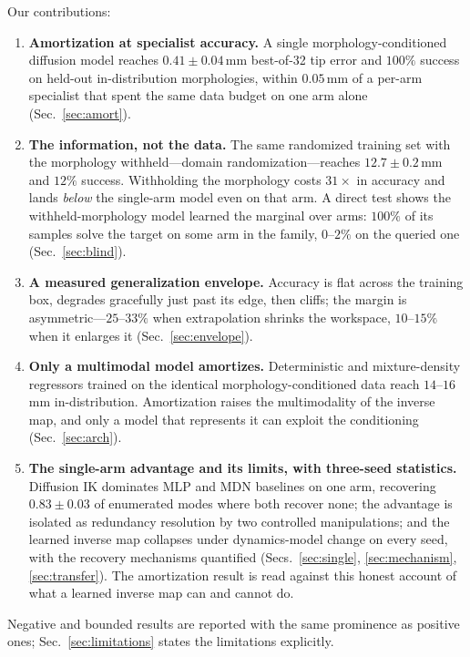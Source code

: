 \documentclass[robotics,article,submit,moreauthors]{Definitions/mdpi}
\begin{document}
Our contributions:
\begin{enumerate}
  \item \textbf{Amortization at specialist accuracy.} A single
  morphology-conditioned diffusion model reaches $0.41\pm0.04\,$mm
  best-of-32 tip error and $100\%$ success on held-out in-distribution
  morphologies, within $0.05\,$mm of a per-arm specialist that spent the
  same data budget on one arm alone (Sec.~\ref{sec:amort}).
  \item \textbf{The information, not the data.} The same randomized training
  set with the morphology withheld---domain randomization---reaches
  $12.7\pm0.2\,$mm and $12\%$ success. Withholding the morphology costs $31\times$
  in accuracy and lands \emph{below} the single-arm model even on that
  arm. A direct test shows the withheld-morphology model learned the
  marginal over arms: $100\%$ of its samples solve the target on some arm
  in the family, $0$--$2\%$ on the queried one (Sec.~\ref{sec:blind}).
  \item \textbf{A measured generalization envelope.} Accuracy is flat across
  the training box, degrades gracefully just past its edge, then cliffs;
  the margin is asymmetric---$25$--$33\%$ when extrapolation shrinks the
  workspace, $10$--$15\%$ when it enlarges it (Sec.~\ref{sec:envelope}).
  \item \textbf{Only a multimodal model amortizes.} Deterministic and
  mixture-density regressors trained on the identical morphology-conditioned
  data reach $14$--$16\,$mm in-distribution. Amortization raises the
  multimodality of the inverse map, and only a model that represents it can
  exploit the conditioning (Sec.~\ref{sec:arch}).
  \item \textbf{The single-arm advantage and its limits, with three-seed
  statistics.} Diffusion IK dominates MLP and MDN baselines on one arm,
  recovering $0.83\pm0.03$ of enumerated modes where both recover none;
  the advantage is isolated as redundancy resolution by two controlled
  manipulations; and the learned inverse map collapses under
  dynamics-model change on every seed, with the recovery mechanisms
  quantified (Secs.~\ref{sec:single}, \ref{sec:mechanism},
  \ref{sec:transfer}). The amortization result is read against this
  honest account of what a learned inverse map can and cannot do.
\end{enumerate}
Negative and bounded results are reported with the same prominence as
positive ones; Sec.~\ref{sec:limitations} states the limitations explicitly.
\end{document}
